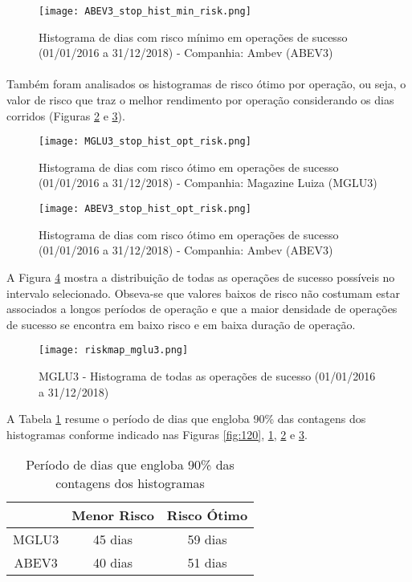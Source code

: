 \begin{figure}[!htb]
    \texttt{[image: ABEV3\_stop\_hist\_min\_risk.png]}
    \centering
    \caption{Histograma de dias com risco mínimo em operações de sucesso (01/01/2016 a 31/12/2018) - Companhia: Ambev (ABEV3)}
    \label{fig:121}
\end{figure}

\paragraph{} Também foram analisados os histogramas de risco ótimo por operação, ou seja, o valor de risco que traz o melhor rendimento por operação considerando os dias corridos (Figuras \ref{fig:122} e \ref{fig:123}).

\begin{figure}[!htb]
    \texttt{[image: MGLU3\_stop\_hist\_opt\_risk.png]}
    \centering
    \caption{Histograma de dias com risco ótimo em operações de sucesso (01/01/2016 a 31/12/2018) - Companhia: Magazine Luiza (MGLU3)}
    \label{fig:122}
\end{figure}

\begin{figure}[!htb]
    \texttt{[image: ABEV3\_stop\_hist\_opt\_risk.png]}
    \centering
    \caption{Histograma de dias com risco ótimo em operações de sucesso (01/01/2016 a 31/12/2018) - Companhia: Ambev (ABEV3)}
    \label{fig:123}
\end{figure}

A Figura \ref{fig:540} mostra a distribuição de todas as operações de sucesso possíveis no intervalo selecionado. Obseva-se que valores baixos de risco não costumam estar associados a longos períodos de operação e que a maior densidade de operações de sucesso se encontra em baixo risco e em baixa duração de operação.

\begin{figure}[!htb]
    \texttt{[image: riskmap\_mglu3.png]}
    \centering
    \caption{MGLU3 - Histograma de todas as operações de sucesso (01/01/2016 a 31/12/2018)}
    \label{fig:540}
\end{figure}

A Tabela \ref{tab:4} resume o período de dias que engloba 90\% das contagens dos histogramas conforme indicado nas Figuras \ref{fig:120}, \ref{fig:121}, \ref{fig:122} e \ref{fig:123}.

\begin{table}[h!]
    \begin{center}
        \begin{tabular}{ c|cc }
            & Menor Risco & Risco Ótimo \\
            \hline
            MGLU3 & 45 dias & 59 dias \\
            ABEV3 & 40 dias & 51 dias \\
        \end{tabular}
        \caption{Período de dias que engloba 90\% das contagens dos histogramas}
        \label{tab:4}
    \end{center}
\end{table}

